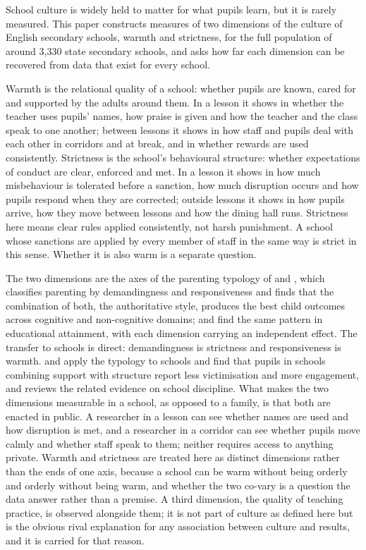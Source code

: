 School culture is widely held to matter for what pupils learn, but it is
rarely measured. This paper constructs measures of two dimensions of the
culture of English secondary schools, warmth and strictness, for the full
population of around 3,330 state secondary schools, and asks how far each
dimension can be recovered from data that exist for every school.

Warmth is the relational quality of a school: whether pupils are known,
cared for and supported by the adults around them. In a lesson it shows in
whether the teacher uses pupils' names, how praise is given and how the
teacher and the class speak to one another; between lessons it shows in how
staff and pupils deal with each other in corridors and at break, and in
whether rewards are used consistently. Strictness is the school's behavioural
structure: whether expectations of conduct are clear, enforced and met. In a
lesson it shows in how much misbehaviour is tolerated before a sanction, how
much disruption occurs and how pupils respond when they are corrected; outside
lessons it shows in how pupils arrive, how they move between lessons and how
the dining hall runs. Strictness here means clear rules applied consistently,
not harsh punishment. A school whose sanctions are applied by every member of
staff in the same way is strict in this sense. Whether it is also warm is a
separate question.

The two dimensions are the axes of the parenting typology of
\citet{baumrind1971} and \citet{maccoby1983}, which classifies parenting by
demandingness and responsiveness and finds that the combination of both, the
authoritative style, produces the best child outcomes across cognitive and
non-cognitive domains; \citet{majumder2015} and \citet{zhang2020} find the
same pattern in educational attainment, with each dimension carrying an
independent effect. The transfer to schools is direct: demandingness is
strictness and responsiveness is warmth. \citet{pellerin2005} and
\citet{gregory2010,gregory2011} apply the typology to schools and find that
pupils in schools combining support with structure report less victimisation
and more engagement, and \citet{gottfredson2005} reviews the related evidence
on school discipline. What makes the two dimensions measurable in a school,
as opposed to a family, is that both are enacted in public. A researcher in a
lesson can see whether names are used and how disruption is met, and a
researcher in a corridor can see whether pupils move calmly and whether staff
speak to them; neither requires access to anything private. Warmth and
strictness are treated here as distinct dimensions rather than the ends of one
axis, because a school can be warm without being orderly and orderly without
being warm, and whether the two co-vary is a question the data answer rather
than a premise. A third dimension, the quality of teaching practice, is
observed alongside them; it is not part of culture as defined here but is the
obvious rival explanation for any association between culture and results,
and it is carried for that reason.

